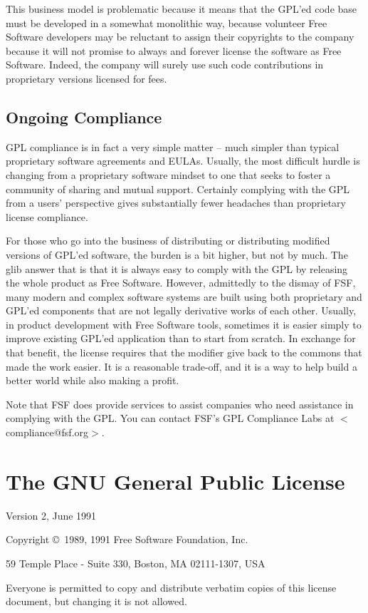 \documentclass[12pt]{report}
\begin{document}
This business model is problematic because it means that the GPL'ed code
base must be developed in a somewhat monolithic way, because volunteer
Free Software developers may be reluctant to assign their copyrights to
the company because it will not promise to always and forever license the
software as Free Software.  Indeed, the company will surely use such code
contributions in proprietary versions licensed for fees.

\section{Ongoing Compliance}

GPL compliance is in fact a very simple matter -- much simpler than
typical proprietary software agreements and EULAs.  Usually, the most
difficult hurdle is changing from a proprietary software mindset to one
that seeks to foster a community of sharing and mutual support.  Certainly
complying with the GPL from a users' perspective gives substantially fewer
headaches than proprietary license compliance.

For those who go into the business of distributing or distributing
modified versions of GPL'ed software, the burden is a bit higher, but not
by much.  The glib answer that is that it is always easy to comply with
the GPL by releasing the whole product as Free Software.  However,
admittedly to the dismay of FSF, many modern and complex software systems
are built using both proprietary and GPL'ed components that are not
legally derivative works of each other.  Usually, in product development
with Free Software tools, sometimes it is easier simply to improve
existing GPL'ed application than to start from scratch.  In exchange for
that benefit, the license requires that the modifier give back to the
commons that made the work easier.  It is a reasonable trade-off, and it
is a way to help build a better world while also making a profit.

Note that FSF does provide services to assist companies who need
assistance in complying with the GPL.  You can contact FSF's GPL
Compliance Labs at $<$compliance@fsf.org$>$.

\appendix

\chapter{The GNU General Public License}

\begin{center}
{\parindent 0in

Version 2, June 1991

Copyright \copyright\ 1989, 1991 Free Software Foundation, Inc.

\bigskip

59 Temple Place - Suite 330, Boston, MA  02111-1307, USA

\bigskip

Everyone is permitted to copy and distribute verbatim copies
of this license document, but changing it is not allowed.
}
\end{center}
\end{document}

